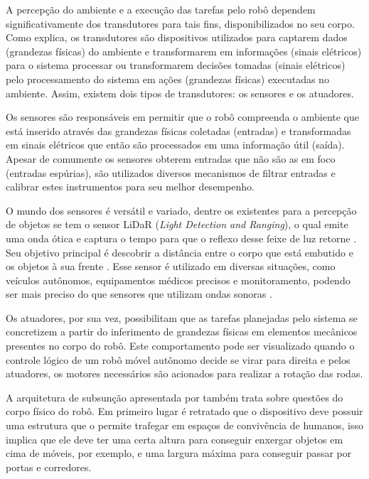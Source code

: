 A percepção do ambiente e a execução das tarefas pelo robô dependem significativamente dos transdutores para tais fins, disponibilizados no seu corpo. Como \citet{instrumentacao:2013} explica, os transdutores são dispositivos utilizados para captarem dados (grandezas físicas)  do ambiente e transformarem em informações (sinais elétricos) para o sistema processar ou transformarem decisões tomadas (sinais elétricos) pelo processamento do sistema em ações (grandezas físicas) executadas no ambiente. Assim, existem dois tipos de transdutores: os sensores e os atuadores. 

Os sensores são responsáveis em permitir que o robô compreenda o ambiente que está inserido através das grandezas físicas coletadas (entradas) e transformadas em sinais elétricos que então são processados em uma informação útil (saída). Apesar de comumente os sensores obterem entradas que não são as em foco (entradas espúrias), são utilizados diversos mecanismos de filtrar entradas e calibrar estes instrumentos para seu melhor desempenho. 

O mundo dos sensores  é versátil e variado, dentre os existentes para a percepção de objetos se tem o sensor LiDaR (\textit{Light Detection and Ranging}), o qual emite uma onda ótica e captura o tempo para que o reflexo desse feixe de luz retorne \cite{lidarComparative:2021, lidarProgress:2022}. Seu objetivo principal é descobrir a distância entre o corpo que está embutido e os objetos à sua frente \cite{lidarProgress:2022, lidarComparative:2021}. Esse sensor é utilizado em diversas situações, como veículos autônomos, equipamentos médicos precisos e monitoramento, podendo ser mais preciso do que sensores que utilizam ondas sonoras \cite{lidarProgress:2022, lidarDetection:2019}.

Os atuadores, por sua vez, possibilitam que as tarefas planejadas pelo sistema se concretizem a partir do inferimento de grandezas físicas em elementos mecânicos presentes no corpo do robô. Este comportamento pode ser visualizado quando o controle lógico de um robô móvel autônomo decide se virar para direita e pelos atuadores, os motores necessários são acionados para realizar a rotação das rodas.  

A arquitetura de subsunção apresentada por \citet{brooks85} também trata sobre questões do corpo físico do robô. Em primeiro lugar é retratado que o dispositivo deve possuir uma estrutura que o permite trafegar em espaços de convivência de humanos, isso implica que ele deve ter uma certa altura para conseguir enxergar objetos em cima de móveis, por exemplo, e uma largura máxima para conseguir passar por portas e corredores. 

